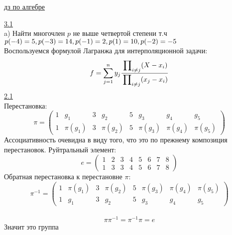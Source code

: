 \documentclass{article}
\begin{document}
\large
\begin{center}
    \underline{дз по алгебре}
\end{center}
\underline{3.1} \\
a) Найти многочлен $p$ не выше четвертой степени т.ч $p(-4) = 5, p(-3) = 14, p(-1) = 2, \\ p(1) = 10, p(-2) = -5$ \\
Воспользуемся формулой Лагранжа для интерполяционной задачи: 
\[ f = \sum\limits_{j=1}^n y_j\frac{\sideset{}{_{i \neq j}}\prod(X - x_i) }{\sideset{}{_{i \neq j}}\prod(x_j - x_i)}\]
\underline{2.1} \\
Перестановка:
\[ \pi = \left(\begin{array}{cccccccc}
    1 & g_1 & 3 & g_2 & 5 & g_3 & g_4 & g_5 \\
    1 & \pi(g_1) & 3 & \pi(g_2) & 5 & \pi(g_3) & \pi(g_4) & \pi(g_5)
\end{array}\right)\]
Ассоциативность очевидна в виду того, что это по прежнему композиция перестановок. Руйтральный элемент: \\
\[e = \left( \begin{array}{cccccccc}
    1 & 2 & 3 & 4 & 5 & 6 & 7 & 8 \\
    1 & 3 & 3 & 4 & 5 & 6 & 7 & 8
\end{array}\right)\]
Обратная перестановка к перестановне $\pi$: \\
\[ \pi^{-1} = \left( \begin{array}{cccccccc}
     1 & \pi(g_1) & 3 & \pi(g_2) & 5 & \pi(g_3) & \pi(g_4) & \pi(g_5) \\
     1 & g_1 & 3 & g_2 & 5 & g_3 & g_4 & g_5
\end{array} \right)\] \\
\[ \pi\pi^{-1} = \pi^{-1}\pi = e \]
Значит это группа
\end{document}
